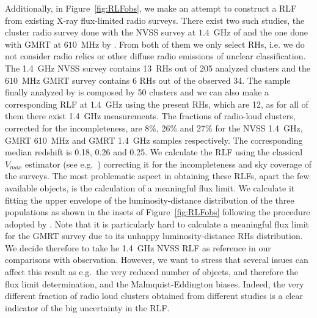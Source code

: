 \documentclass[traditabstract]{aa}
\begin{document}
\begin{appendix}
Additionally, in Figure~\ref{fig:RLFobs}, we make an attempt to construct a RLF from existing X-ray flux-limited radio surveys. There exist two such studies, the cluster radio survey done with the NVSS survey at $1.4$~GHz of \cite{1999NewA....4..141G} and the one done with GMRT at $610$~MHz by \cite{VenturiGMRT_1,VenturiGMRT_2}. From both of them we only select RHs, i.e. we do not consider radio relics or other diffuse radio emissions of unclear classification. The 1.4~GHz NVSS survey contains 13~RHs out of 205 analyzed clusters and the 610~MHz GMRT survey contains 6 RHs out of the observed 34. The sample finally analyzed by \cite{VenturiGMRT_1,VenturiGMRT_2} is composed by 50 clusters and we can also make a corresponding RLF at 1.4~GHz using the present RHs, which are 12, as for all of them there exist 1.4~GHz measurements. The fractions of radio-loud clusters, corrected for the incompleteness, are 8\%, 26\% and 27\% for the NVSS 1.4~GHz, GMRT 610~MHz and GMRT 1.4~GHz samples respectively. The corresponding median redshift is 0.18, 0.26 and 0.25. We calculate the RLF using the classical $V_{max}$ estimator (see e.g.~\citealp{1976ApJ...207..700F}) correcting it for the incompleteness and sky coverage of the surveys. The most problematic aspect in obtaining these RLFs, apart the few available objects, is the calculation of a meaningful flux limit. We calculate it fitting the upper envelope of the luminosity-distance distribution of the three populations as shown in the insets of Figure~\ref{fig:RLFobs} following the procedure adopted by \cite{2011arXiv1106.5494B}. Note that it is particularly hard to calculate a meaningful flux limit for the GMRT survey due to its unhappy luminosity-distance RHs distribution. We decide therefore to take he 1.4~GHz NVSS RLF as reference in our comparisons with observation. However, we want to stress that several issues can affect this result as e.g.~the very reduced number of objects, and therefore the flux limit determination, and the Malmquist-Eddington biases. Indeed, the very different fraction of radio loud clusters obtained from different studies is a clear indicator of the big uncertainty in the RLF.


\end{appendix}
\end{document}
